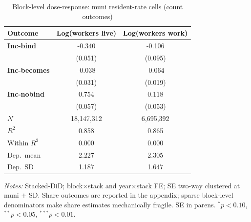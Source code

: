 \begin{table}[!htbp]
  \centering
  \caption{Block-level dose-response: muni resident-rate cells (count outcomes)}
  \label{tab:headline_block_muni_results}
  \footnotesize
  \renewcommand{\arraystretch}{0.9}
  \begin{tabular}{lcc}
    \toprule
    Outcome & Log(workers live) & Log(workers work) \\
    \midrule
    \textbf{Inc-bind} & -0.340\sym{***} & -0.106 \\
                      & (0.051) & (0.095) \\
    \textbf{Inc-becomes} & -0.038 & -0.064\sym{***} \\
                      & (0.031) & (0.019) \\
    \textbf{Inc-nobind} & 0.754\sym{***} & 0.118\sym{**} \\
                      & (0.057) & (0.053) \\
    \midrule
    $N$ & 18,147,312 & 6,695,392 \\
    $R^2$ & 0.858 & 0.865 \\
    Within $R^2$ & 0.000 & 0.000 \\
    Dep.\ mean & 2.227 & 2.305 \\
    Dep.\ SD & 1.187 & 1.647 \\
    \bottomrule
  \end{tabular}
  \vspace{0.3em}
  \begin{minipage}{0.95\textwidth}
    \footnotesize \textit{Notes:} Stacked-DiD; block$\times$stack and year$\times$stack FE; SE two-way clustered at muni $+$ SD. Share outcomes are reported in the appendix; sparse block-level denominators make share estimates mechanically fragile. SE in parens. $^{*}p<0.10$, $^{**}p<0.05$, $^{***}p<0.01$.
  \end{minipage}
\end{table}
